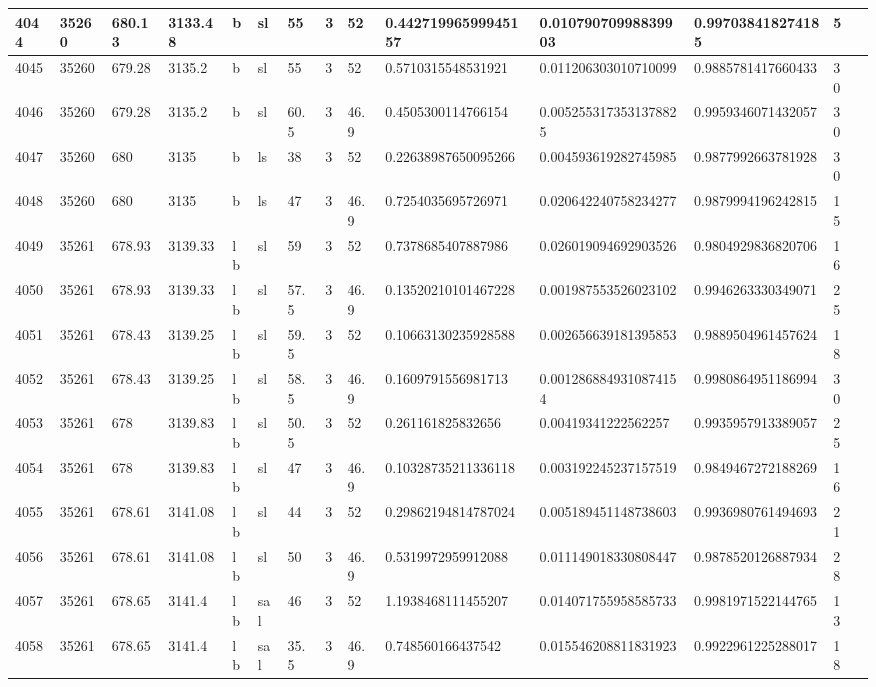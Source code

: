 \documentclass[11pt,a4paper]{article}
\begin{document}
\begin{table}[h]
\begin{tabular}{|l|l|l|l|l|l|l|l|l|l|l|l|l|l|}
4044 & 35260 & 680.13 & 3133.48 & b & sl & 55 & 3 & 52 & 0.44271996599945157 & 0.01079070998839903 & 0.997038418274185 & 5 &  \\ \hline
4045 & 35260 & 679.28 & 3135.2 & b & sl & 55 & 3 & 52 & 0.5710315548531921 & 0.011206303010710099 & 0.9885781417660433 & 30 &  \\ \hline
4046 & 35260 & 679.28 & 3135.2 & b & sl & 60.5 & 3 & 46.9 & 0.4505300114766154 & 0.0052553173531378825 & 0.9959346071432057 & 30 &  \\ \hline
4047 & 35260 & 680 & 3135 & b & ls & 38 & 3 & 52 & 0.22638987650095266 & 0.004593619282745985 & 0.9877992663781928 & 30 &  \\ \hline
4048 & 35260 & 680 & 3135 & b & ls & 47 & 3 & 46.9 & 0.7254035695726971 & 0.020642240758234277 & 0.9879994196242815 & 15 &  \\ \hline
4049 & 35261 & 678.93 & 3139.33 & lb & sl & 59 & 3 & 52 & 0.7378685407887986 & 0.026019094692903526 & 0.9804929836820706 & 16 &  \\ \hline
4050 & 35261 & 678.93 & 3139.33 & lb & sl & 57.5 & 3 & 46.9 & 0.13520210101467228 & 0.001987553526023102 & 0.9946263330349071 & 25 &  \\ \hline
4051 & 35261 & 678.43 & 3139.25 & lb & sl & 59.5 & 3 & 52 & 0.10663130235928588 & 0.002656639181395853 & 0.9889504961457624 & 18 &  \\ \hline
4052 & 35261 & 678.43 & 3139.25 & lb & sl & 58.5 & 3 & 46.9 & 0.1609791556981713 & 0.0012868849310874154 & 0.9980864951186994 & 30 &  \\ \hline
4053 & 35261 & 678 & 3139.83 & lb & sl & 50.5 & 3 & 52 & 0.261161825832656 & 0.00419341222562257 & 0.9935957913389057 & 25 &  \\ \hline
4054 & 35261 & 678 & 3139.83 & lb & sl & 47 & 3 & 46.9 & 0.10328735211336118 & 0.003192245237157519 & 0.9849467272188269 & 16 &  \\ \hline
4055 & 35261 & 678.61 & 3141.08 & lb & sl & 44 & 3 & 52 & 0.29862194814787024 & 0.005189451148738603 & 0.9936980761494693 & 21 &  \\ \hline
4056 & 35261 & 678.61 & 3141.08 & lb & sl & 50 & 3 & 46.9 & 0.5319972959912088 & 0.011149018330808447 & 0.9878520126887934 & 28 &  \\ \hline
4057 & 35261 & 678.65 & 3141.4 & lb & sal & 46 & 3 & 52 & 1.1938468111455207 & 0.014071755958585733 & 0.9981971522144765 & 13 &  \\ \hline
4058 & 35261 & 678.65 & 3141.4 & lb & sal & 35.5 & 3 & 46.9 & 0.748560166437542 & 0.015546208811831923 & 0.9922961225288017 & 18 &  \\ \hline

\end{tabular}
\end{table}
\end{document}
